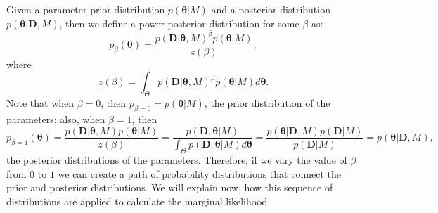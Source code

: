 Given a parameter prior distribution $p ({\bm \theta} | M)$ and a 
posterior distribution $p ({\bm \theta} | {\bm D}, M)$, then we define a
power posterior distribution for some $\beta$ as:
\begin{equation*}
    p_{\beta} ({\bm \theta}) = 
        \frac{p ({\bm D} | {\bm \theta}, M)^\beta p({\bm \theta} | M)}
                              {z (\beta)},
\end{equation*}
where
\begin{equation*}
    z (\beta) = 
        \int_\Theta p ({\bm D} | {\bm \theta}, M)^\beta 
        p({\bm \theta} | M) d{\bm \theta}.
\end{equation*}
Note that when $\beta = 0$, then $p_{\beta=0} = p ({\bm \theta} | M)$, 
the prior distribution of the parameters; also, when $\beta = 1$, then
\begin{equation*}
    p_{\beta=1}({\bm \theta}) = 
        \frac{p ({\bm D} | {\bm \theta}, M) p({\bm \theta} | M)}
             {z (\beta)}
                        =
        \frac{p ({\bm D}, {\bm \theta} | M)}
             {\int_\Theta p ({\bm D}, {\bm \theta} | M)d{\bm \theta}}
                        =
        \frac{p({\bm \theta} | {\bm D}, M) p({\bm D} | M)}
             {p ({\bm D} | M)}
                        =
        p ({\bm \theta} | {\bm D}, M),
\end{equation*}
the posterior distributions of the parameters. Therefore, if we vary the
value of $\beta$ from $0$ to $1$ we can create a path of probability 
distributions that connect the prior and posterior distributions. We
will explain now, how this sequence of distributions are applied to
calculate the marginal likelihood.

